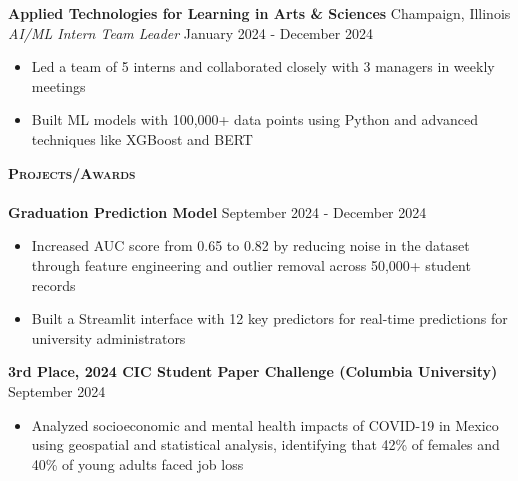 \documentclass[a4paper]{article}
\newcommand{\lineunder} {
    \vspace*{-8pt} \\
    \hspace*{-18pt} \hrulefill \\
}
\newcommand{\header} [1] {
    {\hspace*{-18pt}\vspace*{6pt} \textsc{#1}}
    \vspace*{-6pt} \lineunder
}
\begin{document}
\vspace{1mm}

\textbf{Applied Technologies for Learning in Arts \& Sciences}
\hfill Champaign, Illinois\\
\textit{AI/ML Intern Team Leader} \hfill January 2024 - December 2024\\
    \begin{itemize}[noitemsep]
        \item Led a team of 5 interns and collaborated closely with 3 managers in weekly meetings
        \item Built ML models with 100,000+ data points using Python and advanced techniques like XGBoost and BERT
    \end{itemize}

\vspace{1mm}

\vspace*{1mm}

\header{\textbf{Projects/Awards}}

\textbf{Graduation Prediction Model}
\hfill{September 2024 - December 2024}\\
\begin{itemize}[noitemsep]
    \item Increased AUC score from 0.65 to 0.82 by reducing noise in the dataset through feature
    engineering and outlier removal across 50,000+ student records
    \item Built a Streamlit interface with 12 key predictors for
    real-time predictions for university administrators
\end{itemize}

\textbf{3rd Place, 2024 CIC Student Paper Challenge (Columbia University)} \hfill{September 2024}\\
\begin{itemize}[noitemsep]
    \item Analyzed socioeconomic and mental health impacts of COVID-19 in Mexico using geospatial and
    statistical analysis, identifying that 42\% of females and 40\% of young adults faced job loss
\end{itemize}

\vspace*{1mm}
\end{document}
